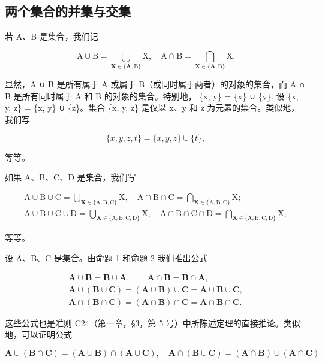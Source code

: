 \subsection{两个集合的并集与交集}

若 A、B 是集合，我们记

\[
\mathrm{A} \cup \mathrm{B} = \bigcup_ {\mathbf {X} \in \{\mathbf {A}, \mathrm{B} \}} \mathrm{X}, \quad \mathrm{A} \cap \mathrm{B} = \bigcap_ {\mathbf {X} \in \{\mathbf {A}, \mathrm{B} \}} \mathrm{X}.
\]

显然，A ∪ B 是所有属于 A 或属于 B（或同时属于两者）的对象的集合，而 A ∩ B 是所有同时属于 A 和 B 的对象的集合。特别地， \{x, y\} = \{x\} ∪ \{y\}. 设 \{x, y, z\} = \{x, y\} ∪ \{z\}。集合 \{x, y, z\} 是仅以 x、y 和 z 为元素的集合。类似地，我们写

\[
\{x, y, z, t \} = \{x, y, z \} \cup \{t \},
\]

等等。

如果 A、B、C、D 是集合，我们写

\[
\begin{array}{c} \mathrm {A \cup B \cup C = \bigcup_ {\mathbf {X} \in \{\mathrm{A,B,C} \}} X, \quad A \cap B \cap C = \bigcap_ {\mathbf {X} \in \{\mathrm{A,B,C} \}} X;} \\ \mathrm {A \cup B \cup C \cup D = \bigcup_ {\mathbf {X} \in \{\mathrm{A,B,C,D} \}} X, \quad A \cap B \cap C \cap D = \bigcap_ {\mathbf {X} \in \{\mathrm{A,B,C,D} \}} X;} \end{array}
\]

等等。

设 A、B、C 是集合。由命题 1 和命题 2 我们推出公式

\[
\begin{array}{c} \mathbf {A} \cup \mathbf {B} = \mathbf {B} \cup \mathbf {A}, \qquad \mathbf {A} \cap \mathbf {B} = \mathbf {B} \cap \mathbf {A}, \\ \mathbf {A} \cup (\mathbf {B} \cup \mathbf {C}) = (\mathbf {A} \cup \mathbf {B}) \cup \mathbf {C} = \mathbf {A} \cup \mathbf {B} \cup \mathbf {C}, \\ \mathbf {A} \cap (\mathbf {B} \cap \mathbf {C}) = (\mathbf {A} \cap \mathbf {B}) \cap \mathbf {C} = \mathbf {A} \cap \mathbf {B} \cap \mathbf {C}. \end{array}
\]

这些公式也是准则 C24（第一章，§3，第 5 号）中所陈述定理的直接推论。类似地，可以证明公式

\[
\mathbf {A} \cup (\mathbf {B} \cap \mathbf {C}) = (\mathbf {A} \cup \mathbf {B}) \cap (\mathbf {A} \cup \mathbf {C}), \quad \mathbf {A} \cap (\mathbf {B} \cup \mathbf {C}) = (\mathbf {A} \cap \mathbf {B}) \cup (\mathbf {A} \cap \mathbf {C})
\]

